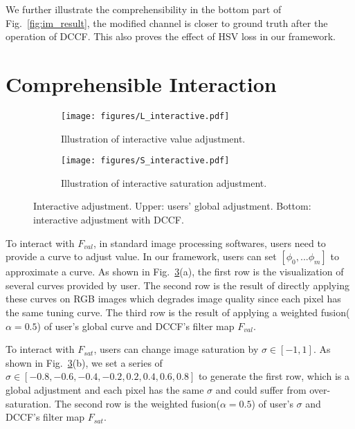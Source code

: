 \documentclass[runningheads]{llncs}
\begin{document}
We further illustrate the comprehensibility in the bottom part of Fig.~\ref{fig:im_result}, the modified channel is closer to ground truth after the operation of DCCF.
This also proves the effect of HSV loss in our framework.

\section{Comprehensible Interaction}
\label{interaction}

\begin{figure}[hthb]
\centering

\begin{subfigure}[t]{1\linewidth}\label{fig:edit_filter_L}
\texttt{[image: figures/L\_interactive.pdf]}
\caption{Illustration of interactive value adjustment. }
\end{subfigure}

\begin{subfigure}[t]{1\linewidth}\label{fig:edit_filter_S}
\texttt{[image: figures/S\_interactive.pdf]}
\caption{Illustration of interactive saturation adjustment. }
\end{subfigure}

\caption{Interactive adjustment.
Upper: users' global adjustment. Bottom: interactive adjustment with DCCF.
}
\label{fig:edit_filter_LS}
\vspace{-10pt}
\end{figure}

To interact with $F_{val}$, in standard image processing softwares, users need to provide a curve to adjust value.
In our framework, users can set $[\phi_0,...\phi_m]$ to approximate a curve.
As shown in Fig.~\ref{fig:edit_filter_LS}(a), the first row is the visualization of several curves provided by user.
The second row is the result of directly applying these curves on RGB images which degrades image quality since each pixel has the same tuning curve.
The third row is the result of applying a weighted fusion($\alpha=0.5$) of user's global curve and DCCF's filter map $F_{val}$.

To interact with $F_{sat}$, users can change image saturation by $\sigma\in[-1, 1]$. 
As shown in Fig.~\ref{fig:edit_filter_LS}(b), we set a series of $\sigma\in[-0.8,-0.6,-0.4,-0.2,0.2,0.4,0.6,0.8]$ to generate the first row, which is a global adjustment and each pixel has the same $\sigma$ and could suffer from over-saturation.
The second row is the weighted fusion($\alpha=0.5$) of user's $\sigma$ and DCCF's filter map $F_{sat}$.
\end{document}
